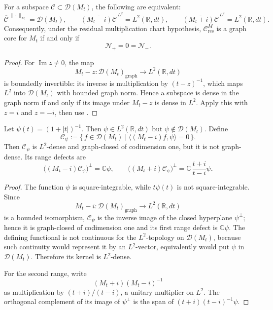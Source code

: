 \begin{corollary}
\label{v4-arith:w9-r4:cor:bulk-deficiency-graph-core}
\ClaimStatusProvedHere For a subspace
\(\mathcal{C}\subset\mathcal{D}(M_t)\), the following are equivalent:
\[
\overline{\mathcal{C}}^{\,\|\cdot\|_{M_t}}=\mathcal{D}(M_t),
\qquad
\overline{(M_t-i)\mathcal{C}}^{\,L^2}=L^2(\mathbb R,dt),
\qquad
\overline{(M_t+i)\mathcal{C}}^{\,L^2}=L^2(\mathbb R,dt).
\]
Consequently, under the residual multiplication chart hypothesis,
\(\mathcal{C}_{\mathrm{res}}^{M}\) is a graph core for \(M_t\) if and
only if
\[
\mathcal{N}_{+}=0=\mathcal{N}_{-}.
\]
\end{corollary}

\begin{proof}
For \(\operatorname{Im}z\neq0\), the map
\[
M_{t}-z\colon \mathcal{D}(M_{t})_{\mathrm{graph}}\to L^{2}(\mathbb{R},dt)
\]
is boundedly invertible: its inverse is multiplication by
\((t-z)^{-1}\), which maps \(L^{2}\) into \(\mathcal{D}(M_{t})\) with
bounded graph norm. Hence a subspace is dense in the graph norm if
and only if its image under \(M_t-z\) is dense in \(L^2\). Apply this
with \(z=i\) and \(z=-i\), then use
.
\end{proof}

\begin{lemma}
\label{v4-arith:w9-r4:lem:rank-one-graph-boundary}
\ClaimStatusProvedHere Let
\(\psi(t)=(1+|t|)^{-1}\). Then
\(\psi\in L^{2}(\mathbb{R},dt)\) but
\(\psi\notin\mathcal{D}(M_t)\). Define
\[
\mathcal{C}_{\psi}
:=
\{\,f\in\mathcal{D}(M_t)\mid
\langle (M_t-i)f,\psi\rangle=0\,\}.
\]
Then \(\mathcal{C}_{\psi}\) is \(L^{2}\)-dense and graph-closed of
codimension one, but it is not graph-dense. Its range defects are
\[
\bigl((M_t-i)\mathcal{C}_{\psi}\bigr)^{\perp}
=\mathbb C\psi,
\qquad
\bigl((M_t+i)\mathcal{C}_{\psi}\bigr)^{\perp}
=
\mathbb C\,\frac{t+i}{t-i}\psi .
\]
\end{lemma}

\begin{proof}
The function \(\psi\) is square-integrable, while
\(t\psi(t)\) is not square-integrable. Since
\[
M_t-i\colon\mathcal{D}(M_t)_{\mathrm{graph}}\to L^2(\mathbb R,dt)
\]
is a bounded isomorphism, \(\mathcal{C}_{\psi}\) is the inverse image
of the closed hyperplane \(\psi^\perp\); hence it is graph-closed of
codimension one and its first range defect is \(\mathbb C\psi\).
The defining functional is not continuous for the \(L^2\)-topology on
\(\mathcal{D}(M_t)\), because such continuity would represent it by
an \(L^2\)-vector, equivalently would put \(\psi\) in
\(\mathcal{D}(M_t)\). Therefore its kernel is \(L^2\)-dense.

For the second range, write
\[
(M_t+i)(M_t-i)^{-1}
\]
as multiplication by \((t+i)/(t-i)\), a unitary multiplier on \(L^2\).
The orthogonal complement of its image of \(\psi^\perp\) is the span
of \((t+i)(t-i)^{-1}\psi\).
\end{proof}

